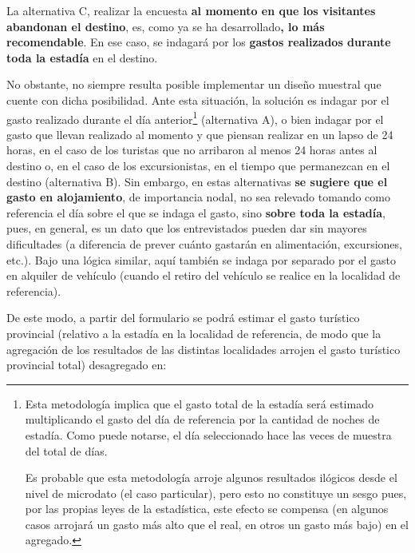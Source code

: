 \documentclass[
]{book}
\begin{document}
La alternativa C, realizar la encuesta \textbf{al momento en que los visitantes abandonan el destino}, es, como ya se ha desarrollado\textbf{, lo más recomendable}. En ese caso, se indagará por los \textbf{gastos realizados durante toda la estadía} en el destino.

No obstante, no siempre resulta posible implementar un diseño muestral que cuente con dicha posibilidad. Ante esta situación, la solución es indagar por el gasto realizado durante el día anterior\footnote{Esta metodología implica que el gasto total de la estadía será estimado multiplicando el gasto del día de referencia por la cantidad de noches de estadía. Como puede notarse, el día seleccionado hace las veces de muestra del total de días.

  Es probable que esta metodología arroje algunos resultados ilógicos desde el nivel de microdato (el caso particular), pero esto no constituye un sesgo pues, por las propias leyes de la estadística, este efecto se compensa (en algunos casos arrojará un gasto más alto que el real, en otros un gasto más bajo) en el agregado.} (alternativa A), o bien indagar por el gasto que llevan realizado al momento y que piensan realizar en un lapso de 24 horas, en el caso de los turistas que no arribaron al menos 24 horas antes al destino o, en el caso de los excursionistas, en el tiempo que permanezcan en el destino (alternativa B). Sin embargo, en estas alternativas \textbf{se sugiere que el gasto en alojamiento}, de importancia nodal, no sea relevado tomando como referencia el día sobre el que se indaga el gasto, sino \textbf{sobre toda la estadía}, pues, en general, es un dato que los entrevistados pueden dar sin mayores dificultades (a diferencia de prever cuánto gastarán en alimentación, excursiones, etc.). Bajo una lógica similar, aquí también se indaga por separado por el gasto en alquiler de vehículo (cuando el retiro del vehículo se realice en la localidad de referencia).

De este modo, a partir del formulario se podrá estimar el gasto turístico provincial (relativo a la estadía en la localidad de referencia, de modo que la agregación de los resultados de las distintas localidades arrojen el gasto turístico provincial total) desagregado en:
\end{document}
